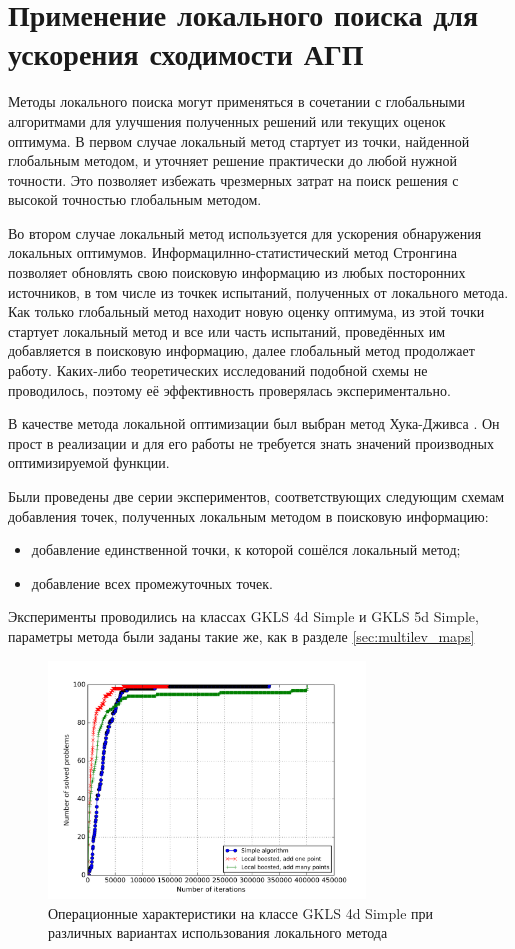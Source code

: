 \section{Применение локального поиска для ускорения сходимости АГП}
Методы локального поиска могут применяться в сочетании с глобальными алгоритмами для улучшения полученных решений или текущих оценок оптимума.
В первом случае локальный метод стартует из точки, найденной глобальным методом, и уточняет решение практически до любой нужной точности. Это
позволяет избежать чрезмерных затрат на поиск решения с высокой точностью глобальным методом.
\par
Во втором случае локальный метод используется для ускорения обнаружения локальных оптимумов.
Информацилнно-статистический метод Стронгина позволяет обновлять свою поисковую информацию из любых посторонних источников, в том числе из точкек испытаний,
полученных от локального метода.
Как только глобальный метод находит новую оценку оптимума, из этой точки стартует локальный метод и все или часть испытаний, проведённых им
добавляется в поисковую информацию, далее глобальный метод продолжает работу. Каких-либо теоретических исследований подобной схемы не проводилось, поэтому её эффективность проверялась экспериментально.
\par
В качестве метода локальной оптимизации был выбран метод Хука-Дживса \cite{himmelblau}. Он прост в реализации и для его работы не требуется знать значений
 производных оптимизируемой функции.
\par
Были проведены две серии экспериментов, соответствующих следующим схемам добавления точек, полученных локальным методом в поисковую информацию:
\begin{itemize}
		\item добавление единственной точки, к которой сошёлся локальный метод;
    \item добавление всех промежуточных точек.
\end{itemize}
\par
Эксперименты проводились на классах GKLS 4d Simple и GKLS 5d Simple, параметры метода были заданы такие же, как в разделе \ref{sec:multilev_maps}
\begin{figure}[ht]
	\center
  \includegraphics[width=0.75\textwidth]{pictures/local_search_op.png}
  \caption{Операционные характеристики на классе GKLS 4d Simple при различных вариантах использования локального метода}
  \label{fig:loaclsearchOP}
\end{figure}
